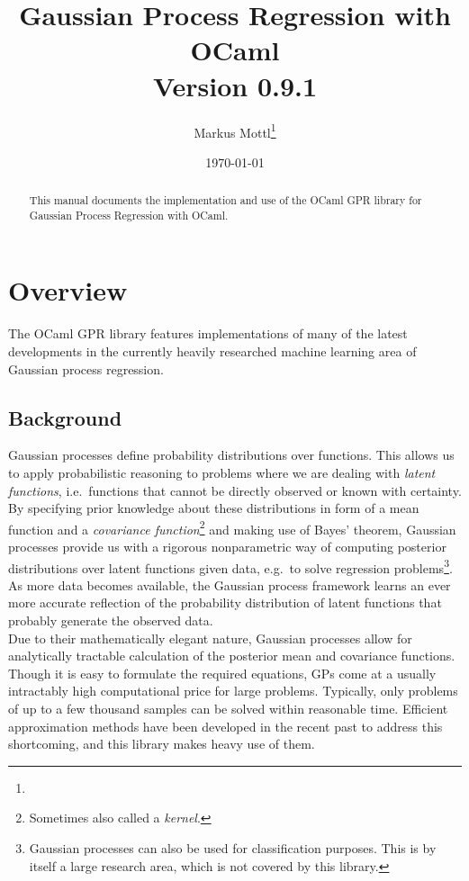 \documentclass[10pt]{report}
\title{Gaussian Process Regression with OCaml\\Version 0.9.1}
\author{Markus Mottl\footnote{\mail}}
\date{\today}
\begin{document}
\maketitle

\begin{abstract}

This manual documents the implementation and use of the OCaml GPR library for
Gaussian Process Regression with OCaml.

\end{abstract}

\tableofcontents

\chapter{Overview}

The OCaml GPR library features implementations of many of the latest
developments in the currently heavily researched machine learning area of
Gaussian process regression.

\section{Background}

Gaussian processes define probability distributions over functions.  This allows
us to apply probabilistic reasoning to problems where we are dealing with
\emph{latent functions}, i.e.\ functions that cannot be directly observed or
known with certainty.  By specifying prior knowledge about these distributions
in form of a mean function and a \emph{covariance function}\footnote{Sometimes
also called a \emph{kernel}.} and making use of Bayes' theorem, Gaussian
processes provide us with a rigorous nonparametric way of computing posterior
distributions over latent functions given data, e.g.\ to solve regression
problems\footnote{Gaussian processes can also be used for classification
purposes.  This is by itself a large research area, which is not covered by this
library.}.  As more data becomes available, the Gaussian process framework
learns an ever more accurate reflection of the probability distribution of
latent functions that probably generate the observed data.\\

Due to their mathematically elegant nature, Gaussian processes allow for
analytically tractable calculation of the posterior mean and covariance
functions.  Though it is easy to formulate the required equations, GPs come at a
usually intractably high computational price for large problems.  Typically,
only problems of up to a few thousand samples can be solved within reasonable
time.  Efficient approximation methods have been developed in the recent past to
address this shortcoming, and this library makes heavy use of them.\\
\end{document}
